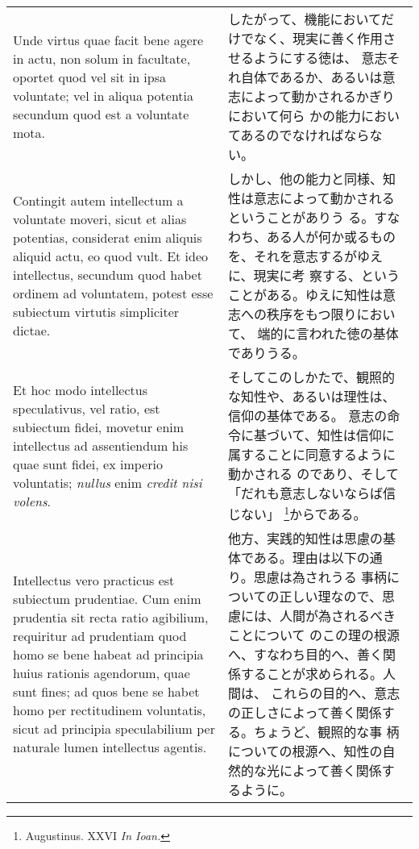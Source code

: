 \documentclass[10pt]{jsarticle}
\begin{document}
\begin{longtable}{p{21em}p{21em}}
 
\\

Unde virtus quae facit bene agere in actu, non solum in facultate,
oportet quod vel sit in ipsa voluntate; vel in aliqua potentia
secundum quod est a voluntate mota.

&

したがって、機能においてだけでなく、現実に善く作用させるようにする徳は、
意志それ自体であるか、あるいは意志によって動かされるかぎりにおいて何ら
かの能力においてあるのでなければならない。

\\

Contingit autem intellectum a voluntate moveri, sicut et alias
potentias, considerat enim aliquis aliquid actu, eo quod vult. Et ideo
intellectus, secundum quod habet ordinem ad voluntatem, potest esse
subiectum virtutis simpliciter dictae.

&

しかし、他の能力と同様、知性は意志によって動かされるということがありう
る。すなわち、ある人が何か或るものを、それを意志するがゆえに、現実に考
察する、ということがある。ゆえに知性は意志への秩序をもつ限りにおいて、
端的に言われた徳の基体でありうる。

\\

Et hoc modo intellectus speculativus, vel ratio, est subiectum fidei,
movetur enim intellectus ad assentiendum his quae sunt fidei, ex
imperio voluntatis; {\itshape nullus} enim {\itshape credit nisi
volens}. 

&

そしてこのしかたで、観照的な知性や、あるいは理性は、信仰の基体である。
意志の命令に基づいて、知性は信仰に属することに同意するように動かされる
のであり、そして「だれも意志しないならば信じない」
\footnote{Augustinus. XXVI {\itshape In Ioan.}}からである。

\\

Intellectus vero practicus est subiectum prudentiae.  Cum enim
prudentia sit recta ratio agibilium, requiritur ad prudentiam quod
homo se bene habeat ad principia huius rationis agendorum, quae sunt
fines; ad quos bene se habet homo per rectitudinem voluntatis, sicut
ad principia speculabilium per naturale lumen intellectus agentis.

&

他方、実践的知性は思慮の基体である。理由は以下の通り。思慮は為されうる
事柄についての正しい理なので、思慮には、人間が為されるべきことについて
のこの理の根源へ、すなわち目的へ、善く関係することが求められる。人間は、
これらの目的へ、意志の正しさによって善く関係する。ちょうど、観照的な事
柄についての根源へ、知性の自然的な光によって善く関係するように。


\end{longtable}
\end{document}
